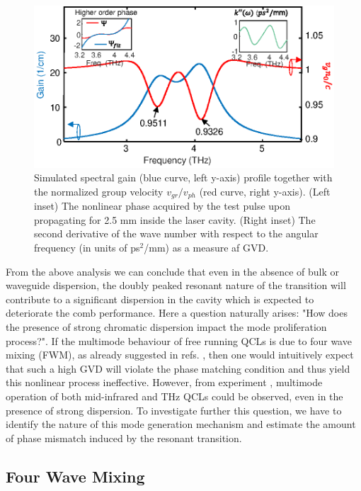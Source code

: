 \documentclass[10pt,letterpaper]{article}
\begin{document}
{\begin{figure}[h!]
	\begin{center}
		\includegraphics[scale=0.8]{figs/THZtds.eps}
		\caption{Simulated spectral gain (blue curve, left y-axis) profile together with the normalized group velocity $v_{gr}/v_{ph}$ (red curve, right y-axis). (Left inset) The nonlinear phase acquired by the test pulse upon propagating for 2.5 mm inside the laser cavity. (Right inset) The second derivative of the wave number with respect to the angular frequency (in units of ps$^2$/mm) as a measure af GVD. }  \label{fig:img03}
	\end{center}	
\end{figure}


From the above analysis we can conclude that even in the absence of bulk or waveguide dispersion, the doubly peaked resonant nature of the transition will contribute to a significant dispersion in the cavity which is expected to deteriorate the comb performance. Here a question naturally arises: "How does the presence of strong chromatic dispersion impact the mode proliferation process?". If the multimode behaviour of free running QCLs is due to four wave mixing (FWM), as already suggested in refs. \cite{friedli2013four,khurgin2014coherent}, then one would intuitively expect that such a high GVD will violate the phase matching condition and thus yield this nonlinear process ineffective. However, from experiment \cite{burghoff2014terahertz,rosch2015octave}, multimode operation of both mid-infrared and THz QCLs could be observed, even in the presence of strong dispersion. To investigate further this question, we have to identify the nature of this mode generation mechanism and estimate the amount of phase mismatch induced by the resonant transition. 


\subsection{Four Wave Mixing}
\label{subsec:FWM}

}
\end{document}
